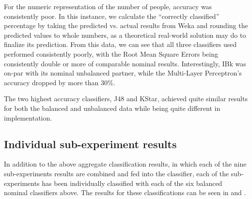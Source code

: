 \documentclass[../thesis/thesis.tex]{subfiles}
\begin{document}
For the numeric representation of the number of people, accuracy was consistently poor. In this instance, we calculate the ``correctly classified'' percentage by taking the predicted vs. actual results from Weka and rounding the predicted values to whole numbers, as a theoretical real-world solution may do to finalize its prediction. From this data, we can see that all three classifiers used performed consistently poorly, with the Root Mean Square Errors being consistently double or more of comparable nominal results. Interestingly, IBk was on-par with its nominal unbalanced partner, while the Multi-Layer Perceptron's accuracy dropped by more than 30\%.

The two highest accuracy classifiers, J48 and KStar, achieved quite similar results for both the balanced and unbalanced data while being quite different in implementation. %

\subsection{Individual sub-experiment results}

In addition to the above aggregate classification results, in which each of the nine sub-experiments results are combined and fed into the classifier, each of the sub-experiments has been individually classified with each of the six balanced nominal classifiers above. The results for these classifications can be seen in  and .
\end{document}
